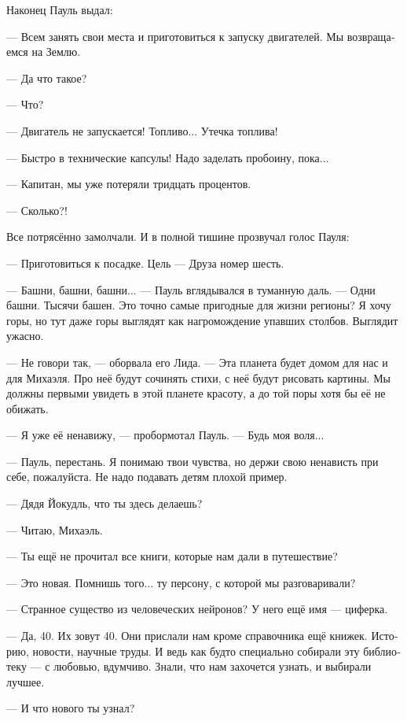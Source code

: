 \documentclass[a4paper,10pt,fleqn]{book}\usepackage{polyglossia}\setdefaultlanguage[babelshorthands=true]{russian}\setotherlanguage{english}\defaultfontfeatures{Ligatures=TeX,Mapping=tex-text}\usepackage{xcolor}\newcommand{\ml}[3]{#2}
\newcommand{\asterism}{\vspace{1em}{\centering\Large\bfseries$\ast~\ast~\ast$\par}\vspace{1em}}
\begin{document}
Наконец Пауль выдал:

--- Всем занять свои места и приготовиться к запуску двигателей.
Мы возвращаемся на Землю.

\asterism

--- Да что такое?

--- Что?

--- Двигатель не запускается!
Топливо...
Утечка топлива!

--- Быстро в технические капсулы!
Надо заделать пробоину, пока...

--- Капитан, мы уже потеряли тридцать процентов.

--- Сколько?!

Все потрясённо замолчали.
И в полной тишине прозвучал голос Пауля:

--- Приготовиться к посадке.
Цель --- Друза номер шесть.

\asterism

--- Башни, башни, башни... --- Пауль вглядывался в туманную даль.
--- Одни башни.
Тысячи башен.
Это точно самые пригодные для жизни регионы?
Я хочу горы, но тут даже горы выглядят как нагромождение упавших столбов.
Выглядит ужасно.

--- Не говори так, --- оборвала его Лида.
--- Эта планета будет домом для нас и для Михаэля.
Про неё будут сочинять стихи, с неё будут рисовать картины.
Мы должны первыми увидеть в этой планете красоту, а до той поры хотя бы её не обижать.

--- Я уже её ненавижу, --- пробормотал Пауль.
--- Будь моя воля...

--- Пауль, перестань.
Я понимаю твои чувства, но держи свою ненависть при себе, пожалуйста.
Не надо подавать детям плохой пример.

\asterism

--- Дядя Йокудль, что ты здесь делаешь?

--- Читаю, Михаэль.

--- Ты ещё не прочитал все книги, которые нам дали в путешествие?

--- Это новая.
Помнишь того... ту персону, с которой мы разговаривали?

--- Странное существо из человеческих нейронов?
У него ещё имя --- циферка.

--- Да, 40.
Их зовут 40.
Они прислали нам кроме справочника ещё книжек.
Историю, новости, научные труды.
И ведь как будто специально собирали эту библиотеку --- с любовью, вдумчиво.
Знали, что нам захочется узнать, и выбирали лучшее.

--- И что нового ты узнал?
\end{document}
